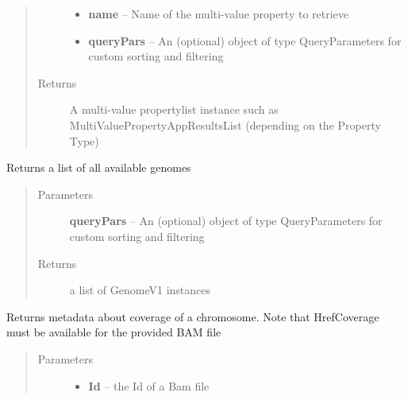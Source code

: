 \documentclass[letterpaper,10pt,english]{sphinxmanual}
\begin{document}
\begin{fulllineitems}
\begin{fulllineitems}
\begin{quote}
\begin{description}
\begin{itemize}
\item {} 
\textbf{name} -- Name of the multi-value property to retrieve

\item {} 
\textbf{queryPars} -- An (optional) object of type QueryParameters for custom sorting and filtering

\end{itemize}

\item[{Returns}] \leavevmode
A multi-value propertylist instance such as MultiValuePropertyAppResultsList (depending on the Property Type)

\end{description}\end{quote}

\end{fulllineitems}


\begin{fulllineitems}
\label{Available modules:BaseSpacePy.api.BaseSpaceAPI.BaseSpaceAPI.getAvailableGenomes}
Returns a list of all available genomes
\begin{quote}\begin{description}
\item[{Parameters}] \leavevmode
\textbf{queryPars} -- An (optional) object of type QueryParameters for custom sorting and filtering

\item[{Returns}] \leavevmode
a list of GenomeV1 instances

\end{description}\end{quote}

\end{fulllineitems}


\begin{fulllineitems}
\label{Available modules:BaseSpacePy.api.BaseSpaceAPI.BaseSpaceAPI.getCoverageMetaInfo}
Returns metadata about coverage of a chromosome.
Note that HrefCoverage must be available for the provided BAM file
\begin{quote}\begin{description}
\item[{Parameters}] \leavevmode\begin{itemize}
\item {} 
\textbf{Id} -- the Id of a Bam file


\end{itemize}
\end{description}
\end{quote}
\end{fulllineitems}
\end{fulllineitems}
\end{document}
